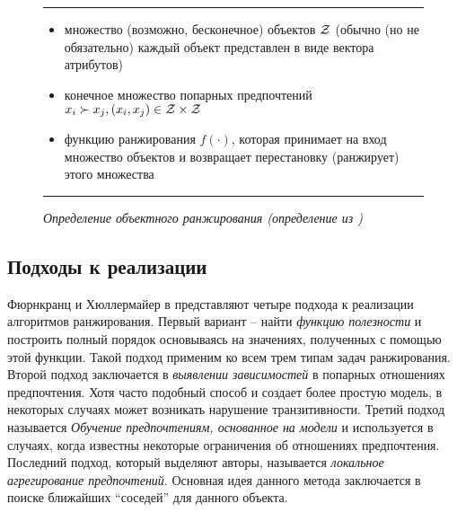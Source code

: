 		\begin{figure}[h]
			\hrule
			\begin{description}[nosep]
				\item[Дано:] \null\leavevmode
				\begin{itemize}[itemsep=0pt,leftmargin=2ex,label=\textbf{---}]
					\item множество (возможно, бесконечное) объектов $\mathcal{Z}$ (обычно (но не обязательно) каждый объект представлен в виде вектора атрибутов)
					\item конечное множество попарных предпочтений $x_i \succ x_j, (x_i, x_j) \in \mathcal{Z} \times \mathcal{Z}$
				\end{itemize}
				\item[Найти:] \null\leavevmode
				\begin{itemize}[itemsep=0pt,leftmargin=2ex,label=\textbf{---}]
					\item функцию ранжирования $f(\cdot)$, которая принимает на вход множество объектов и возвращает перестановку (ранжирует) этого множества
				\end{itemize}
			\end{description} 
			\hrule
			\caption{\it Определение объектного ранжирования (определение из \cite[Fig.~3]{plbook:Introduction:2010})}
			\label{fig:object_ranking}
		\end{figure}
	
	\subsection{Подходы к реализации}
		Фюрнкранц и Хюллермайер в \cite{plbook:Introduction:2010} представляют четыре подхода к реализации алгоритмов ранжирования. 
		Первый вариант – найти \emph{функцию полезности} и построить полный порядок основываясь на значениях, полученных с помощью этой функции. Такой подход применим ко всем трем типам задач ранжирования. 
		Второй подход заключается в \emph{выявлении зависимостей} в попарных отношениях предпочтения. Хотя часто подобный способ и создает более простую модель, в некоторых случаях может возникать нарушение транзитивности\cite[p.~10]{plbook:Introduction:2010}. 
		Третий подход называется \emph{Обучение предпочтениям, основанное на модели} и используется в случаях, когда известны некоторые ограничения об отношениях предпочтения. 
		Последний подход, который выделяют авторы, называется \emph{локальное агрегирование предпочтений}. Основная идея данного метода заключается в поиске ближайших \enquote{соседей} для данного объекта.
		
